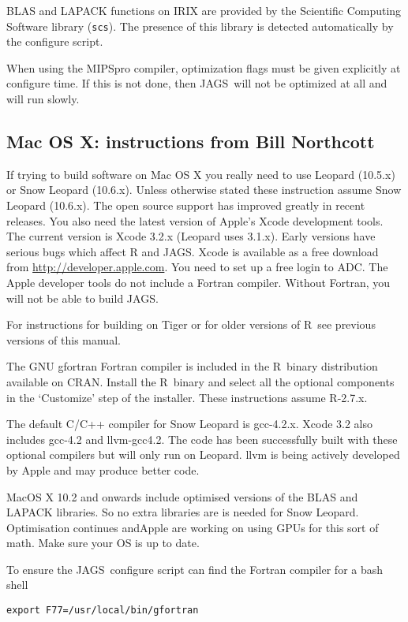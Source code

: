 \documentclass[11pt, a4paper, titlepage]{report}
\newcommand{\JAGS}{\textsf{JAGS}}
\newcommand{\R}{\textsf{R}}
\begin{document}
BLAS and LAPACK functions on IRIX are provided by the Scientific
Computing Software library (\verb+scs+). The presence of this library
is detected automatically by the configure script.

When using the MIPSpro compiler, optimization flags must be given
explicitly at configure time. If this is not done, then \JAGS\ will
not be optimized at all and will run slowly.

\subsection{Mac OS X: instructions from Bill Northcott}

If trying to build software on Mac OS X you really need to use Leopard
(10.5.x) or Snow Leopard (10.6.x). Unless otherwise stated these
instruction assume Snow Leopard (10.6.x). The open source support has
improved greatly in recent releases. You also need the latest version
of Apple's Xcode development tools. The current version is Xcode 3.2.x
(Leopard uses 3.1.x).  Early versions have serious bugs which affect R
and \JAGS.  Xcode is available as a free download from
\url{http://developer.apple.com}. You need to set up a free login to
ADC. The Apple developer tools do not include a Fortran
compiler. Without Fortran, you will not be able to build \JAGS.

For instructions for building on Tiger or for older versions of
\R\ see previous versions of this manual.

The GNU gfortran Fortran compiler is included in the \R\ binary
distribution available on CRAN. Install the \R\ binary and select all
the optional components in the `Customize' step of the installer.
These instructions assume R-2.7.x.

The default C/C++ compiler for Snow Leopard is gcc-4.2.x. Xcode 3.2
also includes gcc-4.2 and llvm-gcc4.2.  The code has been successfully
built with these optional compilers but will only run on Leopard.
llvm is being actively developed by Apple and may produce better code.

MacOS X 10.2 and onwards include optimised versions of the BLAS and
LAPACK libraries.  So no extra libraries are is needed for Snow
Leopard.  Optimisation continues andApple are working on using GPUs
for this sort of math.  Make sure your OS is up to date.

To ensure the \JAGS\ configure script can find the Fortran compiler
for a bash shell
\begin{verbatim}
export F77=/usr/local/bin/gfortran
\end{verbatim}
\end{document}
